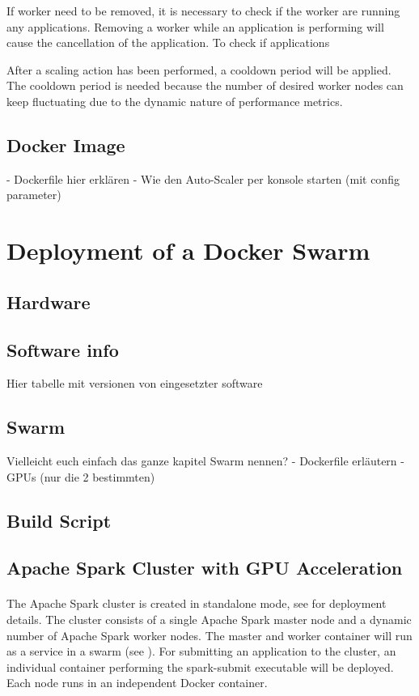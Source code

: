 If worker need to be removed, it is necessary to check if the worker are running any applications. Removing a worker while an application is performing will cause the cancellation of the application.
To check if applications 


After a scaling action has been performed, a cooldown period will be applied. The cooldown period is needed because the number of desired worker nodes can keep fluctuating due to the dynamic nature of performance metrics.


\subsection{Docker Image}
- Dockerfile hier erklären
- Wie den Auto-Scaler per konsole starten (mit config parameter)


\section{Deployment of a Docker Swarm}


\subsection{Hardware}


\subsection{Software info}
Hier tabelle mit versionen von eingesetzter software


\subsection{Swarm}
Vielleicht euch einfach das ganze kapitel Swarm nennen?
- Dockerfile erläutern
- GPUs (nur die 2 bestimmten)


\subsection{Build Script}


\subsection{Apache Spark Cluster with GPU Acceleration}
\paragraph{}The Apache Spark cluster is created in standalone mode, see  for deployment details.
The cluster consists of a single Apache Spark master node and a dynamic number of Apache Spark worker nodes. The master and worker container will run as a service in a swarm (see ).
For submitting an application to the cluster, an individual container performing the spark-submit executable will be deployed.
Each node runs in an independent Docker container.


